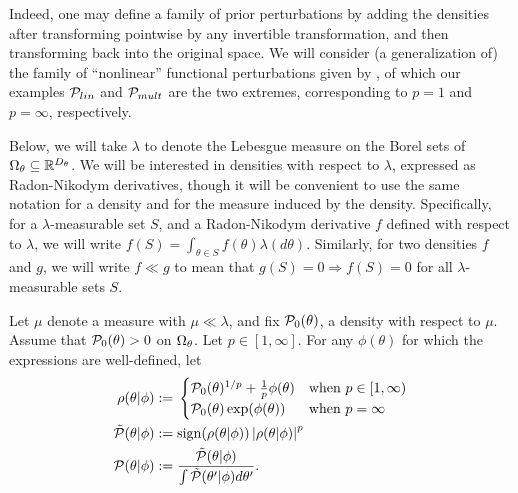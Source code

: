 Indeed, one may define a family of prior perturbations by adding the densities
after transforming pointwise by any invertible transformation, and then
transforming back into the original space.  We will consider (a generalization
of) the family of ``nonlinear'' functional perturbations given by
\citep{gustafson:1996:local}, of which our examples $\mathcal{P}_{lin}$ and $\mathcal{P}_{mult}$
are the two extremes, corresponding to $p=1$ and $p=\infty$, respectively.

Below, we will take $\lambda$ to denote the Lebesgue measure on the Borel sets
of $\Omega_{\theta} \subseteq \mathbb{R}^{{D_{\theta}}}$.  We will be interested in
densities with respect to $\lambda$, expressed as Radon-Nikodym derivatives,
though it will be convenient to use the same notation for a density and for the
measure induced by the density.  Specifically, for a $\lambda$-measurable set
$S$, and a Radon-Nikodym derivative $f$ defined with respect to $\lambda$, we
will write $f(S) = \int_{\theta \in S} f(\theta) \lambda(d\theta)$.  Similarly,
for two densities $f$ and $g$, we will write $f \ll g$ to mean that $g(S) = 0
\Rightarrow f(S) = 0$ for all $\lambda$-measurable sets $S$.

\begin{defn}
%
Let $\mu$ denote a measure with $\mu \ll \lambda$, and fix $\mathcal{P}_{0}(\theta)$, a
density with respect to $\mu$.  Assume that $\mathcal{P}_{0}(\theta) > 0$ on $\Omega_{\theta}$.
Let $p \in [1, \infty]$.  For any $\phi(\theta)$ for which the expressions are
well-defined, let
%
\begin{align*}
%
\rho(\theta \vert \phi) :={}& \begin{cases}
%
\pbase(\theta)^{1/p} + \frac{1}{p}\phi(\theta)
    & \textrm{when }p \in [1, \infty) \\
\pbase(\theta)\exp(\phi(\theta))
    & \textrm{when }p = \infty
%
\end{cases}\\
%
\tilde{\p}(\theta \vert \phi) :={}&
    \mathrm{sign}(\rho(\theta \vert \phi)) \abs{\rho(\theta \vert \phi)}^p\\
\p(\theta \vert \phi) :={}&
    \frac{\tilde{\p}(\theta \vert \phi)}
         {\int \tilde{\p}(\theta' \vert \phi) d\theta'}.
%
\end{align*}
%
\end{defn}
%

